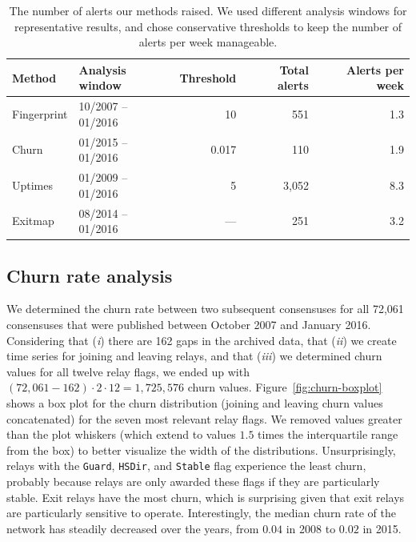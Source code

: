 \begin{table}[ht]
	\centering
	\begin{tabular}{l l r r r}
	\toprule

	\textbf{Method} &
	\textbf{Analysis window} &
	\textbf{Threshold} &
	\textbf{Total alerts} &
	\textbf{Alerts per week} \\

	\midrule
	Fingerprint & 10/2007 -- 01/2016 & 10 & 551 & 1.3 \\
	Churn & 01/2015 -- 01/2016 & 0.017 & 110 & 1.9 \\
	Uptimes & 01/2009 -- 01/2016 & 5 & 3,052 & 8.3 \\
	\midrule
	Exitmap & 08/2014 -- 01/2016 & --- & 251 & 3.2 \\
	\bottomrule
	\end{tabular}
	\caption{The number of alerts our methods raised.  We used different
	analysis windows for representative results, and chose conservative
	thresholds to keep the number of alerts per week manageable.}
	\label{tab:num-alerts}
\end{table}

\subsection{Churn rate analysis}
\label{sec:churn}
We determined the churn rate between two subsequent consensuses for all 72,061
consensuses that were published between October 2007 and January 2016.
Considering that (\emph{i}) there are 162 gaps in the archived data, that
(\emph{ii}) we create time series for joining and leaving relays, and that
(\emph{iii}) we determined churn values for all twelve relay flags, we ended up
with $(72,061 - 162) \cdot 2 \cdot 12 = 1,725,576$ churn values.
Figure~\ref{fig:churn-boxplot} shows a box plot for the churn distribution
(joining and leaving churn values concatenated) for the seven most relevant
relay flags.  We removed values greater than the plot whiskers (which extend to
values $1.5$ times the interquartile range from the box) to better visualize the
width of the distributions.  Unsurprisingly, relays with the \texttt{Guard},
\texttt{HSDir}, and \texttt{Stable} flag experience the least churn, probably
because relays are only awarded these flags if they are particularly stable.
Exit relays have the most churn, which is surprising given that exit relays are
particularly sensitive to operate.  Interestingly, the median churn rate of the
network has steadily decreased over the years, from $0.04$ in 2008 to $0.02$ in
2015.

